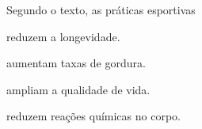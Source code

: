 
Segundo o texto, as práticas esportivas  

\begin{escolha}
\item reduzem a longevidade.

\item aumentam taxas de gordura.

\item ampliam a qualidade de vida.

\item reduzem reações químicas no corpo.
\end{escolha}




